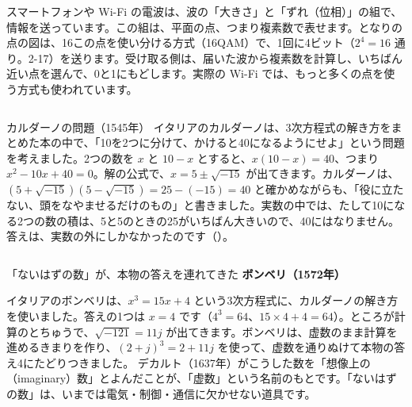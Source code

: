\begin{butsuri}
\noindent\begin{minipage}[c]{0.6\linewidth}
\raggedright
スマートフォンや Wi-Fi の電波は、波の「大きさ」と「ずれ（位相）」の組で、情報を送っています。この組は、平面の点、つまり複素数で表せます。となりの点の図は、16この点を使い分ける方式（16QAM）で、1回に4ビット（$2^4=16$ 通り。2-17）を送ります。受け取る側は、届いた波から複素数を計算し、いちばん近い点を選んで、0と1にもどします。実際の Wi-Fi では、もっと多くの点を使う方式も使われています。
\end{minipage}\hfill
\begin{minipage}[c]{0.36\linewidth}
\centering
{}
\end{minipage}
\end{butsuri}

\begin{column}{カルダーノの問題（1545年）}
イタリアのカルダーノは、3次方程式の解き方をまとめた本の中で、「10を2つに分けて、かけると40になるようにせよ」という問題を考えました。2つの数を $x$ と $10-x$ とすると、$x(10-x)=40$、つまり $x^2-10x+40=0$。解の公式で、$x=5\pm\sqrt{-15}$ が出てきます。カルダーノは、$(5+\sqrt{-15})(5-\sqrt{-15})=25-(-15)=40$ と確かめながらも、「役に立たない、頭をなやませるだけのもの」と書きました。実数の中では、たして10になる2つの数の積は、5と5のときの25がいちばん大きいので、40にはなりません。答えは、実数の外にしかなかったのです（）。
\end{column}

\begin{column}{「ないはずの数」が、本物の答えを連れてきた}
\textbf{ボンベリ（1572年）}\par
イタリアのボンベリは、$x^3=15x+4$ という3次方程式に、カルダーノの解き方を使いました。答えの1つは $x=4$ です（$4^3=64$、$15\times4+4=64$）。ところが計算のとちゅうで、$\sqrt{-121}=11j$ が出てきます。ボンベリは、虚数のまま計算を進めるきまりを作り、$(2+j)^3=2+11j$ を使って、虚数を通りぬけて本物の答え4にたどりつきました。
デカルト（1637年）がこうした数を「想像上の（imaginary）数」とよんだことが、「虚数」という名前のもとです。「ないはずの数」は、いまでは電気・制御・通信に欠かせない道具です。
\end{column}

